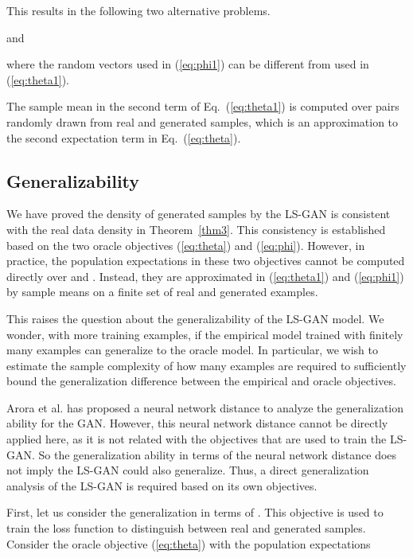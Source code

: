 \documentclass[11pt,fullpage, letterpaper,twoside]{article}
\newcommand{\1}[1]{\mathds{1}_{\left[#1\right]}}
\begin{document}
This results in the following two alternative problems.

and

where the random vectors  used in (\ref{eq:phi1}) can be different from  used in (\ref{eq:theta1}).

The sample mean in the second term of Eq.~(\ref{eq:theta1}) is computed over pairs  randomly drawn from real and generated samples, which is an approximation to the second expectation term in Eq.~(\ref{eq:theta}).










\subsection{Generalizability}\label{sec:gen}

We have proved the density of generated samples by the LS-GAN is consistent with the real data density in Theorem~\ref{thm3}. This consistency is established based on the two oracle objectives (\ref{eq:theta}) and (\ref{eq:phi}).  However, in practice, the population expectations in these two objectives cannot be computed directly over  and . Instead, they are approximated in (\ref{eq:theta1}) and (\ref{eq:phi1}) by sample means on a finite set of real and generated examples.

This raises the question about the generalizability of the LS-GAN model.  We wonder, with more training examples, if the empirical model trained with finitely many examples can generalize to the oracle model. In particular, we wish to estimate the sample complexity of how many examples are required to sufficiently bound the generalization difference between the empirical and oracle objectives.



Arora et al. \cite{arora2017generalization} has proposed a neural network distance to analyze the generalization ability for the GAN. However, this neural network distance cannot be directly applied here, as it is not related with the objectives that are used to train the LS-GAN. So the generalization ability in terms of the neural network distance does not imply the LS-GAN could also generalize. Thus, a direct generalization analysis of the LS-GAN is required based on its own objectives.

First, let us consider the generalization in terms of .
This objective is used to train the loss function  to distinguish between real and generated samples.
Consider the oracle objective  (\ref{eq:theta}) with the population expectations
\end{document}
